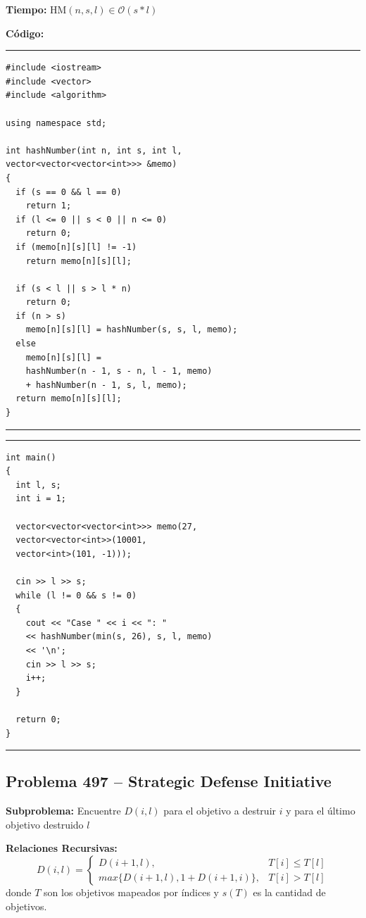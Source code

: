 \documentclass[a4paper, 12pt]{article}
\def\bigO{\mathcal{O}}
\begin{document}
\textbf{Tiempo:} HM$(n,s,l)\in \bigO(s * l)$

\textbf{Código:}\\
\strut\hspace{1cm}\begin{minipage}[t]{7cm}
  \hrule\begin{lstlisting}
#include <iostream>
#include <vector>
#include <algorithm>

using namespace std;

int hashNumber(int n, int s, int l,
vector<vector<vector<int>>> &memo)
{
  if (s == 0 && l == 0)
    return 1;
  if (l <= 0 || s < 0 || n <= 0)
    return 0;
  if (memo[n][s][l] != -1)
    return memo[n][s][l];

  if (s < l || s > l * n)
    return 0;
  if (n > s)
    memo[n][s][l] = hashNumber(s, s, l, memo);
  else
    memo[n][s][l] =
    hashNumber(n - 1, s - n, l - 1, memo)
    + hashNumber(n - 1, s, l, memo);
  return memo[n][s][l];
}    
\end{lstlisting}\hrule
\end{minipage}\hfill\begin{minipage}[t]{7cm}
  \hrule\begin{lstlisting}[firstnumber=27]
int main()
{
  int l, s;
  int i = 1;

  vector<vector<vector<int>>> memo(27,
  vector<vector<int>>(10001,
  vector<int>(101, -1)));

  cin >> l >> s;
  while (l != 0 && s != 0)
  {
    cout << "Case " << i << ": "
    << hashNumber(min(s, 26), s, l, memo)
    << '\n';
    cin >> l >> s;
    i++;
  }

  return 0;
}
\end{lstlisting}\hrule
\end{minipage}

\subsection{Problema 497 -- Strategic Defense Initiative}

\textbf{Subproblema:}
Encuentre $D(i,l)$ para el objetivo a destruir $i$ y para el último objetivo destruido $l$

\textbf{Relaciones Recursivas: }\\[-2mm]
$$D(i,l)=\begin{cases}
    D(i+1,l),                   & T[i] \leq T[l] \\
    max\{D(i+1,l),1+D(i+1,i)\}, & T[i] > T[l]
  \end{cases}$$
donde $T$ son los objetivos mapeados por índices y $s(T)$ es la cantidad de objetivos.
\end{document}
